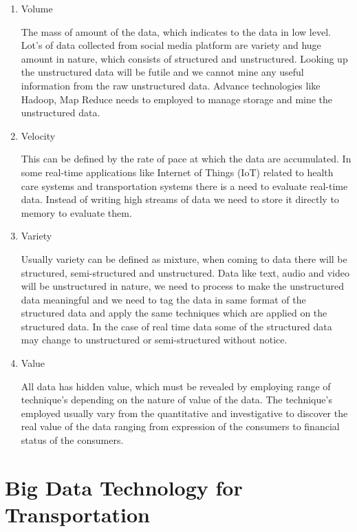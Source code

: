 \documentclass[sigconf]{acmart}
\begin{document}
\begin{enumerate}
\item Volume

The mass of amount of the data, which indicates to the data in low level. Lot's of data collected from social media platform are variety and huge amount in nature, which consists of structured and unstructured. Looking up the unstructured data will be futile and we cannot mine any useful information from the raw unstructured data. Advance technologies like Hadoop, Map Reduce needs to employed to manage storage and mine the unstructured data.

\item Velocity

This can be defined by the rate of pace at which the data are accumulated. In some real-time applications like Internet of Things (IoT) related to health care systems and transportation systems there is a need to evaluate real-time data. Instead of writing high streams of data we need to store it directly to memory to evaluate them. 
\item Variety

Usually variety can be defined as mixture, when coming to data there will be structured, semi-structured and unstructured. Data like text, audio and video will be unstructured in nature, we need to process to make the unstructured data meaningful and we need to tag the data in same format of the structured data and apply the same techniques which are applied on the structured data. In the case of real time data some of the structured data may change to unstructured or semi-structured without notice.

\item Value

All data has hidden value, which must be revealed by employing range of technique's depending on the nature of value of the data. The technique's employed usually vary from the quantitative and investigative to discover the real value of the data ranging from expression of the consumers to financial status of the consumers.




\end{enumerate}


\section{Big Data Technology for Transportation}
\end{document}
